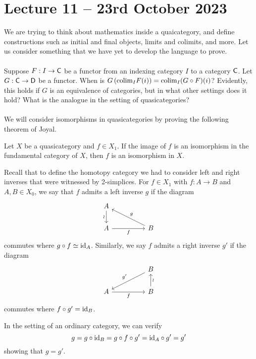 \section{Lecture 11 -- 23rd October 2023}
We are trying to think about mathematics inside a quaicategory, and define constructions such as initial and final objects, limits and colimits, and more. Let us consider something that we have yet to develop the language to prove. 
\\\\
Suppose $F:I\to\mathsf{C}$ be a functor from an indexing category $I$ to a category $\mathsf{C}$. Let $G:\mathsf{C}\to\mathsf{D}$ be a functor. When is $G\left(\mathrm{colim}_{I}F(i)\right)=\mathrm{colim}_{I}(G\circ F)(i)$? Evidently, this holds if $G$ is an equivalence of categories, but in what other settings does it hold? What is the analogue in the setting of quasicategories?
\\\\
We will consider isomorphisms in quasicategories by proving the following theorem of Joyal. 
\begin{theorem}[Joyal]\label{thm: Joyal on iso iff iso in fundamental category}
    Let $X$ be a quasicategory and $f\in X_{1}$. If the image of $f$ is an isomorphism in the fundamental category of $X$, then $f$ is an isomorphism in $X$. 
\end{theorem}
Recall that to define the homotopy category we had to consider left and right inverses that were witnessed by 2-simplices. For $f\in X_{1}$ with $f:A\to B$ and $A,B\in X_{0}$, we say that $f$ admits a left inverse $g$ if the diagram 
$$%
\begin{tikzcd}
	A \\
	A && B
	\arrow["\wr"', from=1-1, to=2-1]
	\arrow["f"', from=2-1, to=2-3]
	\arrow["g"', from=2-3, to=1-1]
\end{tikzcd}$$
commutes where $g\circ f\simeq\mathrm{id}_{A}$. Similarly, we say $f$ admits a right inverse $g'$ if the diagram 
$$%
\begin{tikzcd}
	&& B \\
	A && B
	\arrow["\wr"', from=2-3, to=1-3]
	\arrow["{g'}"', from=1-3, to=2-1]
	\arrow["f"', from=2-1, to=2-3]
\end{tikzcd}$$
commutes where $f\circ g'=\mathrm{id}_{B}$. 
\begin{remark}
    In the setting of an ordinary category, we can verify 
    $$g=g\circ\mathrm{id}_{B}=g\circ f\circ g'=\mathrm{id}_{A}\circ g'=g'$$
    showing that $g=g'$. 
\end{remark}
